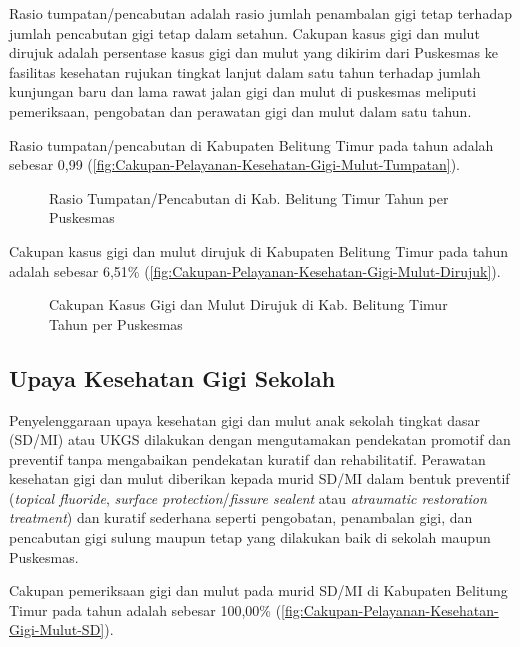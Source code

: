 Rasio tumpatan/pencabutan adalah rasio jumlah penambalan gigi tetap terhadap jumlah pencabutan gigi tetap dalam setahun.
Cakupan kasus gigi dan mulut dirujuk adalah persentase kasus gigi dan mulut yang dikirim dari Puskesmas ke fasilitas kesehatan rujukan tingkat lanjut dalam satu tahun terhadap jumlah kunjungan baru dan lama rawat jalan gigi dan mulut di puskesmas meliputi pemeriksaan, pengobatan dan perawatan gigi dan mulut dalam satu tahun.

Rasio tumpatan/pencabutan di Kabupaten Belitung Timur pada tahun \tP adalah sebesar 0,99 (\autoref{fig:Cakupan-Pelayanan-Kesehatan-Gigi-Mulut-Tumpatan}).

\begin{figure}[H]
	\centering
	\caption{Rasio Tumpatan/Pencabutan di Kab. Belitung Timur Tahun \tP per Puskesmas}
	\label{fig:Cakupan-Pelayanan-Kesehatan-Gigi-Mulut-Tumpatan}
\end{figure}

Cakupan kasus gigi dan mulut dirujuk di Kabupaten Belitung Timur pada tahun \tP adalah sebesar 6,51\% (\autoref{fig:Cakupan-Pelayanan-Kesehatan-Gigi-Mulut-Dirujuk}).

\begin{figure}[H]
	\centering
	\caption{Cakupan Kasus Gigi dan Mulut Dirujuk di Kab. Belitung Timur Tahun \tP per Puskesmas}
	\label{fig:Cakupan-Pelayanan-Kesehatan-Gigi-Mulut-Dirujuk}
\end{figure}

\subsection{Upaya Kesehatan Gigi Sekolah}
Penyelenggaraan upaya kesehatan gigi dan mulut anak sekolah tingkat dasar (SD/MI) atau UKGS dilakukan dengan mengutamakan pendekatan promotif dan preventif tanpa mengabaikan pendekatan kuratif dan rehabilitatif.
Perawatan kesehatan gigi dan mulut diberikan kepada murid SD/MI dalam bentuk preventif (\textit{topical fluoride}, \textit{surface protection}/\textit{fissure sealent} atau \textit{atraumatic restoration treatment}) dan kuratif sederhana seperti pengobatan, penambalan gigi, dan pencabutan gigi sulung maupun tetap yang dilakukan baik di sekolah maupun Puskesmas.

Cakupan pemeriksaan gigi dan mulut pada murid SD/MI di Kabupaten Belitung Timur pada tahun \tP adalah sebesar 100,00\% (\autoref{fig:Cakupan-Pelayanan-Kesehatan-Gigi-Mulut-SD}).


